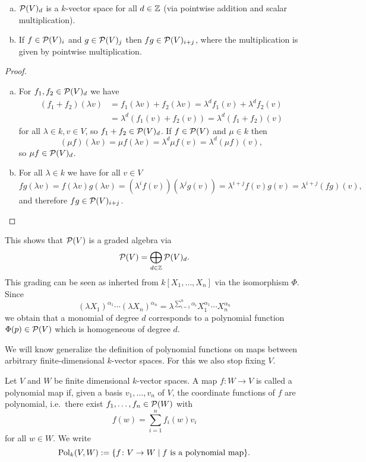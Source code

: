 \begin{lem}\leavevmode
 \begin{enumerate}[a)]
  \item
   $\mathcal{P}(V)_d$ is a $k$-vector space for all $d \in \mathbb{Z}$ (via pointwise addition and scalar multiplication).
  \item
   If $f \in \mathcal{P}(V)_i$ and $g \in \mathcal{P}(V)_j$  then $fg \in \mathcal{P}(V)_{i+j}$, where the multiplication is given by pointwise multiplication.
 \end{enumerate}
\end{lem}
\begin{proof}\leavevmode
 \begin{enumerate}[a)]
  \item For $f_1, f_2 \in \mathcal{P}(V)_d$ we have
  \begin{align*}
   (f_1+f_2)(\lambda v)
   &= f_1(\lambda v) + f_2(\lambda v)
   = \lambda^d f_1(v) + \lambda^d f_2(v) \\
   &= \lambda^d (f_1(v) + f_2(v))
   = \lambda^d (f_1 + f_2)(v)
  \end{align*}
  for all $\lambda \in k, v \in V$, so $f_1 + f_2 \in \mathcal{P}(V)_d$. If $f \in \mathcal{P}(V)$ and $\mu \in k$ then
  \[
   (\mu f)(\lambda v) = \mu f(\lambda v) = \lambda^d \mu f(v) = \lambda^d (\mu f)(v),
  \]
  so $\mu f \in \mathcal{P}(V)_d$.
  \item
  For all $\lambda \in k$ we have for all $v \in V$
  \[
   fg(\lambda v)
   = f(\lambda v) g(\lambda v)
   = \left(\lambda^i f(v)\right)\left(\lambda^j g(v)\right)
   = \lambda^{i+j} f(v) g(v)
   = \lambda^{i+j} (fg)(v),
  \]
  and therefore $fg \in \mathcal{P}(V)_{i+j}$. \qedhere
 \end{enumerate}
\end{proof}

This shows that $\mathcal{P}(V)$ is a graded algebra via
\[
  \mathcal{P}(V) = \bigoplus_{d \in \mathbb{Z}} \mathcal{P}(V)_d.
\]
This grading can be seen as inherted from $k[X_1, \dotsc, X_n]$ via the isomorphism $\Phi$. Since
\[
 (\lambda X_1)^{\alpha_1} \dotsm (\lambda X_n)^{\alpha_n}
 = \lambda^{\sum_{i=1}^n \alpha_i} X_1^{\alpha_1} \dotsm X_n^{\alpha_n}
\]
we obtain that a monomial of degree $d$ corresponds to a polynomial function $\Phi(p) \in \mathcal{P}(V)$ which is homogeneous of degree $d$.


We will know generalize the definition of polynomial functions on maps between arbitrary finite-dimensional $k$-vector spaces. For this we also stop fixing $V$.


\begin{defi}
 Let $V$ and $W$ be finite dimensional $k$-vector spaces. A map $f \colon W \to V$ is called a polynomial map if, given a basis $v_1, \dotsc, v_n$ of $V$, the coordinate functions of $f$ are polynomial, i.e.\ there exist $f_1, \dotsc, f_n \in \mathcal{P}(W)$ with
 \[
  f(w) = \sum_{i=1}^n f_i(w) v_i
 \]
 for all $w \in W$. We write
 \[
  \operatorname{Pol}_k(V,W) := \{f \colon V \to W \mid f \text{ is a polynomial map}\}.
 \]
\end{defi}


